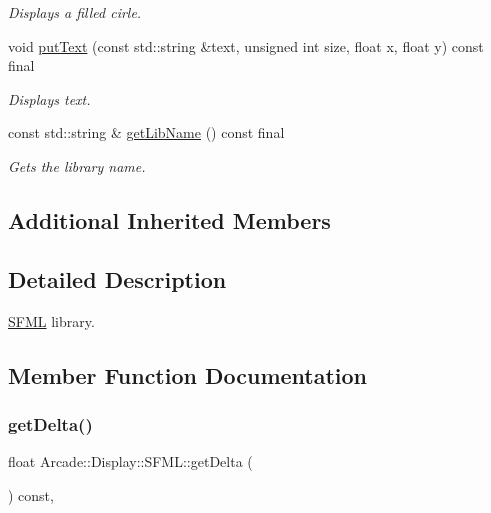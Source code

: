 \begin{DoxyCompactItemize}
\begin{DoxyCompactList}\small\item\em Displays a filled cirle. \end{DoxyCompactList}\item 
void \mbox{\hyperlink{classArcade_1_1Display_1_1SFML_a88bb03b669afd0df748fd66bf24d45f3}{put\+Text}} (const std\+::string \&text, unsigned int size, float x, float y) const final
\begin{DoxyCompactList}\small\item\em Displays text. \end{DoxyCompactList}\item 
const std\+::string \& \mbox{\hyperlink{classArcade_1_1Display_1_1SFML_a8c323cea968403cb2edf791d37dc7887}{get\+Lib\+Name}} () const final
\begin{DoxyCompactList}\small\item\em Gets the library name. \end{DoxyCompactList}\end{DoxyCompactItemize}
\subsection*{Additional Inherited Members}


\subsection{Detailed Description}
\mbox{\hyperlink{classArcade_1_1Display_1_1SFML}{S\+F\+ML}} library. 

\subsection{Member Function Documentation}
\mbox{\label{classArcade_1_1Display_1_1SFML_ae1466db8c13b08e99ebe5ffab68884c7}} 
\subsubsection{\texorpdfstring{getDelta()}{getDelta()}}
{\footnotesize\ttfamily float Arcade\+::\+Display\+::\+S\+F\+M\+L\+::get\+Delta (\begin{DoxyParamCaption}{ }\end{DoxyParamCaption}) const\hspace{0.3cm}{\ttfamily [final]}, {\ttfamily [virtual]}}



